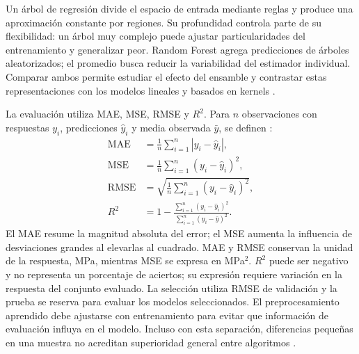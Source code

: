 Un árbol de regresión divide el espacio de entrada mediante reglas y produce
una aproximación constante por regiones. Su profundidad controla parte de su
flexibilidad: un árbol muy complejo puede ajustar particularidades del
entrenamiento y generalizar peor. Random Forest agrega predicciones de
árboles aleatorizados; el promedio busca reducir la variabilidad del estimador
individual. Comparar ambos permite estudiar el efecto del ensamble y
contrastar estas representaciones con los modelos lineales y basados en kernels
\cite{sklearn_arboles,breiman2001}.

La evaluación utiliza MAE, MSE, RMSE y $R^2$. Para $n$ observaciones con
respuestas $y_i$, predicciones $\hat y_i$ y media observada $\bar y$, se definen
\cite{sklearn_metricas}:
\begin{align*}
\mathrm{MAE} &= \frac{1}{n}\sum_{i=1}^{n}|y_i-\hat y_i|,\\
\mathrm{MSE} &= \frac{1}{n}\sum_{i=1}^{n}(y_i-\hat y_i)^2,\\
\mathrm{RMSE} &= \sqrt{\frac{1}{n}\sum_{i=1}^{n}(y_i-\hat y_i)^2},\\
R^2 &= 1-\frac{\sum_{i=1}^{n}(y_i-\hat y_i)^2}
{\sum_{i=1}^{n}(y_i-\bar y)^2}.
\end{align*}
El MAE resume la magnitud absoluta del error; el MSE aumenta la influencia de
desviaciones grandes al elevarlas al cuadrado. MAE y RMSE conservan la unidad
de la respuesta, MPa, mientras MSE se expresa en MPa$^2$. $R^2$ puede ser
negativo y no representa un porcentaje de aciertos; su expresión requiere
variación en la respuesta del conjunto evaluado. La selección utiliza RMSE
de validación y la prueba se reserva para evaluar los modelos seleccionados.
El preprocesamiento aprendido debe ajustarse con entrenamiento para evitar
que información de evaluación influya en el modelo. Incluso con esta
separación, diferencias pequeñas en una muestra no acreditan superioridad
general entre algoritmos \cite{sklearn_fuga,cawley2010}.

